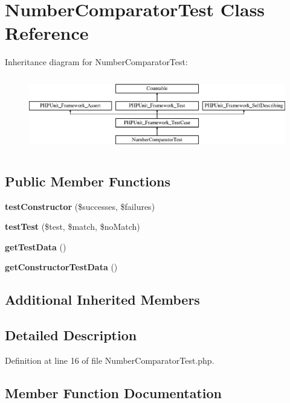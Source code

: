 \section{Number\+Comparator\+Test Class Reference}
\label{class_symfony_1_1_component_1_1_finder_1_1_tests_1_1_comparator_1_1_number_comparator_test}
Inheritance diagram for Number\+Comparator\+Test\+:\begin{figure}[H]
\begin{center}
\leavevmode
\includegraphics[height=3.303835cm]{class_symfony_1_1_component_1_1_finder_1_1_tests_1_1_comparator_1_1_number_comparator_test}
\end{center}
\end{figure}
\subsection*{Public Member Functions}
\begin{DoxyCompactItemize}
\item 
{\bf test\+Constructor} (\$successes, \$failures)
\item 
{\bf test\+Test} (\$test, \$match, \$no\+Match)
\item 
{\bf get\+Test\+Data} ()
\item 
{\bf get\+Constructor\+Test\+Data} ()
\end{DoxyCompactItemize}
\subsection*{Additional Inherited Members}


\subsection{Detailed Description}


Definition at line 16 of file Number\+Comparator\+Test.\+php.



\subsection{Member Function Documentation}
